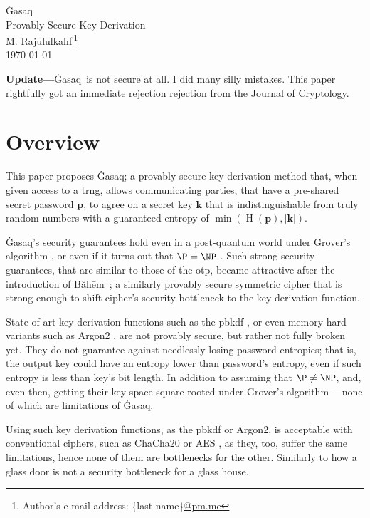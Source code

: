 \documentclass[twocolumn,hidelinks]{article}
\newcommand{\ghasaq}{Ġasaq}
\newcommand{\baheem}{Băhēm}
\DeclareMathOperator{\entropy}{H}
\begin{document}
\begin{center}
    \Huge
    \ghasaq\\
    \Large
    Provably Secure Key Derivation\\
    \normalsize
    \vspace{0.5em}
    M. Rajululkahf\,\footnote{Author's
    e-mail address: \{last name\}\url{@pm.me}}\\
    \vspace{0.5em}
    \footnotesize
    \today\\
\end{center}

\noindent
{\color{red}\textbf{Update---}\ghasaq\ is not secure at all.  I did many silly
mistakes.  This paper rightfully got an immediate rejection rejection from
the Journal of Cryptology.}

\section*{Overview}
This paper proposes \ghasaq; a provably secure key derivation method that,
when given access to a \gls{trng}, allows communicating parties, that have
a pre-shared secret password $\mathbf{p}$, to agree on a secret key
$\mathbf{k}$ that is indistinguishable from truly random numbers with a
guaranteed entropy of $\min(\entropy(\mathbf{p}), |\mathbf{k}|)$.

\ghasaq's security guarantees hold even in a post-quantum world under
Grover's algorithm \cite{10.1145/237814.237866}, or even if it turns out
that $\P = \NP$ \cite{10.1145/800157.805047}. Such strong security
guarantees, that are similar to those of the \gls{otp}, became attractive
after the introduction of \baheem\ \cite{baheem}; a similarly provably
secure symmetric cipher that is strong enough to shift cipher's security
bottleneck to the key derivation function.

State of art key derivation functions such as the \gls{pbkdf}
\cite{rfc8018}, or even memory-hard variants such as Argon2 \cite{argon2},
are not provably secure, but rather not fully broken yet.  They do not
guarantee against needlessly losing password entropies; that is, the output
key could have an entropy lower than password's entropy, even if such
entropy is less than key's bit length. In addition to assuming that $\P \ne
\NP$, and, even then, getting their key space square-rooted under Grover's
algorithm ---none of which are limitations of \ghasaq.

Using such key derivation functions, as the \gls{pbkdf} or Argon2, is
acceptable with conventional ciphers, such as ChaCha20 \cite{chacha20} or
AES \cite{aes}, as they, too, suffer the same limitations, hence none of
them are bottlenecks for the other.  Similarly to how a glass door is not a
security bottleneck for a glass house.
\end{document}
